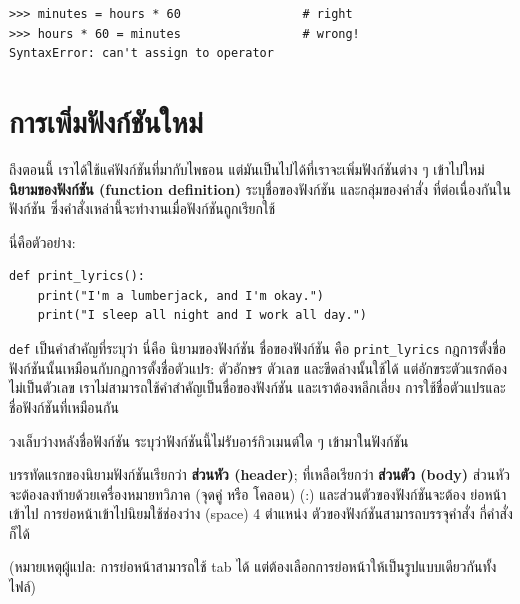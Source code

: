 \begin{verbatim}
>>> minutes = hours * 60                 # right
>>> hours * 60 = minutes                 # wrong!
SyntaxError: can't assign to operator
\end{verbatim}
%


\section{การเพิ่มฟังก์ชันใหม่} %

ถึงตอนนี้ เราได้ใช้แค่ฟังก์ชันที่มากับไพธอน แต่มันเป็นไปได้ที่เราจะเพิ่มฟังก์ชันต่าง ๆ เข้าไปใหม่
{\bf นิยามของฟังก์ชัน (function definition)} ระบุชื่อของฟังก์ชัน และกลุ่มของคำสั่ง
ที่ต่อเนื่องกันในฟังก์ชัน ซึ่งคำสั่งเหล่านี้จะทำงานเมื่อฟังก์ชันถูกเรียกใช้

นี่คือตัวอย่าง:

\begin{verbatim}
def print_lyrics():
    print("I'm a lumberjack, and I'm okay.")
    print("I sleep all night and I work all day.")
\end{verbatim}
%
{\tt def} เป็นคำสำคัญที่ระบุว่า นี่คือ นิยามของฟังก์ชัน  ชื่อของฟังก์ชัน คือ \verb|print_lyrics|
กฎการตั้งชื่อฟังก์ชันนั้นเหมือนกับกฎการตั้งชื่อตัวแปร: ตัวอักษร ตัวเลข และขีดล่างนั้นใช้ได้ 
แต่อักขระตัวแรกต้องไม่เป็นตัวเลข เราไม่สามารถใช้คำสำคัญเป็นชื่อของฟังก์ชัน และเราต้องหลีกเลี่ยง
การใช้ชื่อตัวแปรและชื่อฟังก์ชันที่เหมือนกัน

วงเล็บว่างหลังชื่อฟังก์ชัน ระบุว่าฟังก์ชันนี้ไม่รับอาร์กิวเมนต์ใด ๆ เข้ามาในฟังก์ชัน
 


บรรทัดแรกของนิยามฟังก์ชันเรียกว่า {\bf ส่วนหัว (header)}; ที่เหลือเรียกว่า {\bf ส่วนตัว (body)}
ส่วนหัวจะต้องลงท้ายด้วยเครื่องหมายทวิภาค (จุดคู่ หรือ โคลอน) (:) และส่วนตัวของฟังก์ชันจะต้อง
ย่อหน้าเข้าไป การย่อหน้าเข้าไปนิยมใช้ช่องว่าง (space) 4 ตำแหน่ง ตัวของฟังก์ชันสามารถบรรจุคำสั่ง
กี่คำสั่งก็ได้

(หมายเหตุผู้แปล: การย่อหน้าสามารถใช้ tab ได้ แต่ต้องเลือกการย่อหน้าให้เป็นรูปแบบเดียวกันทั้งไฟล์)

